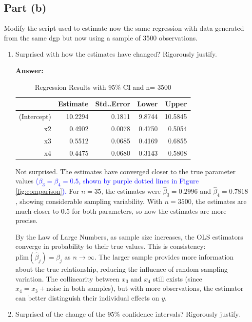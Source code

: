 \documentclass[12pt,a4paper]{article}
\begin{document}
\subsection*{Part (b)}
Modify the script used to estimate now the same regression with data 
generated from the same dgp but now using a sample of 3500 observations.

\begin{enumerate}[label=(\roman*)]
  \item Surprised with how the estimates have changed? Rigorously justify.
  
  \textbf{Answer:} 

  \begin{table}[ht]
\centering
\caption{Regression Results with 95\% CI and n= 3500} 
\label{tab:regression2}
\begin{tabular}{rrrrr}
  \hline
 & Estimate & Std..Error & Lower & Upper \\ 
  \hline
(Intercept) & 10.2294 & 0.1811 & 9.8744 & 10.5845 \\ 
  x2 & 0.4902  & 0.0078  & 0.4750 & 0.5054 \\ 
  x3 &0.5512 &  0.0685 & 0.4169 & 0.6855 \\ 
  x4 & 0.4475 & 0.0680 & 0.3143 & 0.5808 \\ 
   \hline
\end{tabular}
\end{table}
  
  Not surprised. The estimates have converged closer to the true parameter 
  values 
\textcolor{blue}{($\beta_3=\beta_4=0.5$, shown by purple dotted lines in Figure 
  \ref{fig:comparison}).} For $n=35$, the estimates were $\hat{\beta}_3=0.2996$ 
  and $\hat{\beta}_4=0.7818$, showing considerable sampling variability. 
  With $n=3500$, the estimates are much closer to 0.5 for both parameters, so now the estimates are more precise.
  
  By the Law of Large Numbers, as sample size increases, the OLS estimators 
  converge in probability to their true values. This is consistency: 
  $\text{plim}(\hat{\beta}_j) = \beta_j$ as $n \to \infty$. The larger 
  sample provides more information about the true relationship, reducing 
  the influence of random sampling variation. The collinearity between $x_3$ 
  and $x_4$ still exists (since $x_4 = x_3 + \text{noise}$ in both samples), 
  but with more observations, the estimator can better distinguish their 
  individual effects on $y$.
  
  
  \item Surprised of the change of the 95\% confidence intervals? Rigorously justify.
  

\end{enumerate}
\end{document}
